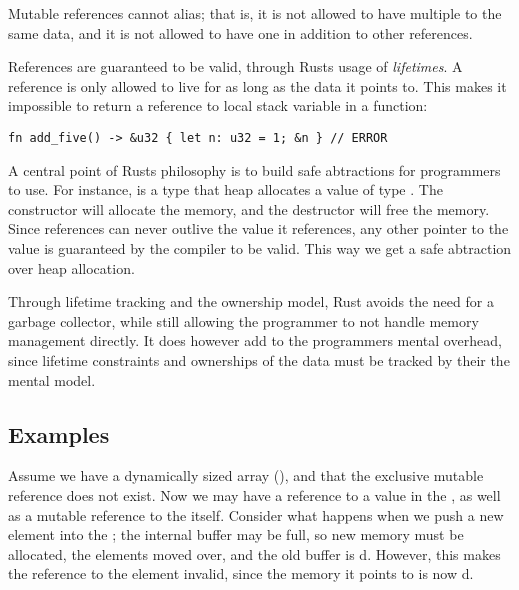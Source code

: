 \documentclass[b5paper,twoside]{report}
\begin{document}
Mutable references cannot alias; that is, it is not allowed to have multiple 
to the same data, and it is not allowed to have one  in addition to other
references.

References are guaranteed to be valid, through Rusts usage of \emph{lifetimes}.
A reference is only allowed to live for as long as the data it points to.
This makes it impossible to return a reference to local stack variable in a function:
\begin{lstlisting}[firstnumber=last]
fn add_five() -> &u32 { let n: u32 = 1; &n } // ERROR
\end{lstlisting}

A central point of Rusts philosophy is to build safe abtractions for programmers to use.
For instance,  is a type that heap allocates a value of type .
The constructor will allocate the memory, and the destructor will free the memory.
Since references can never outlive the value it references, any other pointer to the value
is guaranteed by the compiler to be valid.
This way we get a safe abtraction over heap allocation.

Through lifetime tracking and the ownership model, Rust avoids the need for a
garbage collector, while still allowing the programmer to not handle memory
management directly. It does however add to the programmers mental overhead,
since lifetime constraints and ownerships of the data must be tracked by their
the mental model.



\subsection{Examples}


Assume we have a dynamically sized array (), and that the exclusive
mutable reference does not exist. Now we may have a reference to a value
in the , as well as a mutable reference to the  itself.
Consider what happens when we push a new element into the ;
the internal buffer may be full, so new memory must be allocated,
the elements moved over, and the old buffer is d.
However, this makes the reference to the element invalid, since the memory
it points to is now d.
\end{document}
